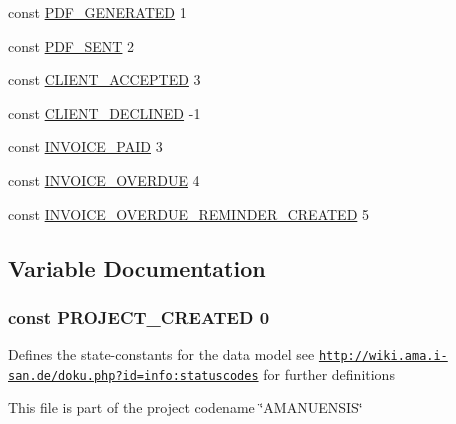\begin{DoxyCompactItemize}
\item 
const \hyperlink{state__constants_8php_a04ebd20953c2e35ed2d3190ee9f51aa3}{P\+D\+F\+\_\+\+G\+E\+N\+E\+R\+A\+T\+E\+D} 1
\item 
const \hyperlink{state__constants_8php_a3566f66cefbc079bfe12c580ab435d15}{P\+D\+F\+\_\+\+S\+E\+N\+T} 2
\item 
const \hyperlink{state__constants_8php_ac8a499359086bec8e2d47f91cba4eb31}{C\+L\+I\+E\+N\+T\+\_\+\+A\+C\+C\+E\+P\+T\+E\+D} 3
\item 
const \hyperlink{state__constants_8php_aa398870ec700028fa7a1674373a0f52c}{C\+L\+I\+E\+N\+T\+\_\+\+D\+E\+C\+L\+I\+N\+E\+D} -\/1
\item 
const \hyperlink{state__constants_8php_a57379cd29f42791044409779ac937c96}{I\+N\+V\+O\+I\+C\+E\+\_\+\+P\+A\+I\+D} 3
\item 
const \hyperlink{state__constants_8php_afd3c01555c47fa6ca67bdc57615598c5}{I\+N\+V\+O\+I\+C\+E\+\_\+\+O\+V\+E\+R\+D\+U\+E} 4
\item 
const \hyperlink{state__constants_8php_adeb474f7f2397652f66d7ccd03f93c34}{I\+N\+V\+O\+I\+C\+E\+\_\+\+O\+V\+E\+R\+D\+U\+E\+\_\+\+R\+E\+M\+I\+N\+D\+E\+R\+\_\+\+C\+R\+E\+A\+T\+E\+D} 5
\end{DoxyCompactItemize}


\subsection{Variable Documentation}
\hypertarget{state__constants_8php_a4a341097343a682ca8ea9c23e1cdb560}{}
\subsubsection[{P\+R\+O\+J\+E\+C\+T\+\_\+\+C\+R\+E\+A\+T\+E\+D}]{\setlength{\rightskip}{0pt plus 5cm}const P\+R\+O\+J\+E\+C\+T\+\_\+\+C\+R\+E\+A\+T\+E\+D 0}\label{state__constants_8php_a4a341097343a682ca8ea9c23e1cdb560}
Defines the state-\/constants for the data model see \href{http://wiki.ama.i-san.de/doku.php?id=info:statuscodes}{\tt http\+://wiki.\+ama.\+i-\/san.\+de/doku.\+php?id=info\+:statuscodes} for further definitions

This file is part of the project codename \char`\"{}\+A\+M\+A\+N\+U\+E\+N\+S\+I\+S\char`\"{}


